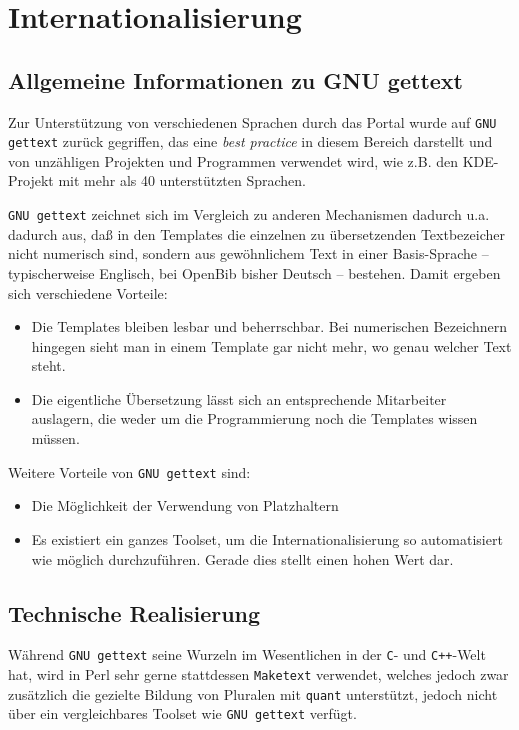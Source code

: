\documentclass[11pt, twoside, a4paper, BCOR8mm, DIV12, bibtotoc,idxtotoc]{scrbook}
\begin{document}
\section{Internationalisierung}

\subsection{Allgemeine Informationen zu GNU gettext}

Zur Unterstützung von verschiedenen Sprachen durch das Portal wurde
auf \texttt{GNU gettext} zurück gegriffen, das eine \emph{best
  practice} in diesem Bereich darstellt und von unzähligen Projekten
und Programmen verwendet wird, wie z.B. den KDE-Projekt mit mehr als
40 unterstützten Sprachen.

\texttt{GNU gettext} zeichnet sich im Vergleich zu anderen Mechanismen
dadurch u.a. dadurch aus, daß in den Templates die einzelnen zu
übersetzenden Textbezeicher nicht numerisch sind, sondern aus
gewöhnlichem Text in einer Basis-Sprache -- typischerweise Englisch,
bei OpenBib bisher Deutsch -- bestehen. Damit ergeben sich
verschiedene Vorteile:

\begin{itemize}
\item Die Templates bleiben lesbar und beherrschbar. Bei numerischen
  Bezeichnern hingegen sieht man in einem Template gar nicht mehr, wo
  genau welcher Text steht.
\item Die eigentliche Übersetzung lässt sich an entsprechende
  Mitarbeiter auslagern, die weder um die Programmierung noch die
  Templates wissen müssen.
\end{itemize}

Weitere Vorteile von \texttt{GNU gettext} sind:

\begin{itemize}
\item Die Möglichkeit der Verwendung von Platzhaltern
\item Es existiert ein ganzes Toolset, um die Internationalisierung so
  automatisiert wie möglich durchzuführen. Gerade dies stellt einen
  hohen Wert dar.
\end{itemize}

\subsection{Technische Realisierung}

Während \texttt{GNU gettext} seine Wurzeln im Wesentlichen in der
\texttt{C}- und \texttt{C++}-Welt hat, wird in Perl sehr gerne
stattdessen \texttt{Maketext} verwendet, welches jedoch zwar
zusätzlich die gezielte Bildung von Pluralen mit \texttt{quant}
unterstützt, jedoch nicht über ein vergleichbares Toolset wie
\texttt{GNU gettext} verfügt.
\end{document}
